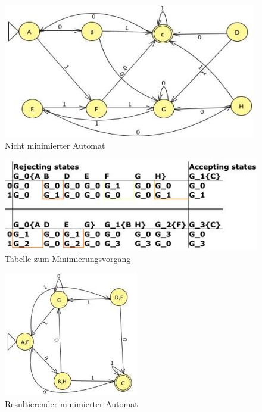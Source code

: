 \begin{figure}[h]
 \centering
 \includegraphics[keepaspectratio, scale=0.75]{objectsToInclude/Moore_nichtminimal.jpg}
 \caption{Nicht minimierter Automat}
\label{fig:FSA_Moore_notminimal}
\end{figure}

\begin{figure}[h]
 \centering
 \includegraphics[keepaspectratio, scale=0.75]{objectsToInclude/Moore_Tab.jpg}
 \caption{Tabelle zum Minimierungsvorgang}
\label{fig:FSA_Moore_Tab}
\end{figure}

\begin{figure}[h]
 \centering
 \includegraphics[keepaspectratio, scale=0.75]{objectsToInclude/Moore_minimal.jpg}
 \caption{Resultierender minimierter Automat}
\label{fig:FSA_Moore_minimal}
\end{figure}
